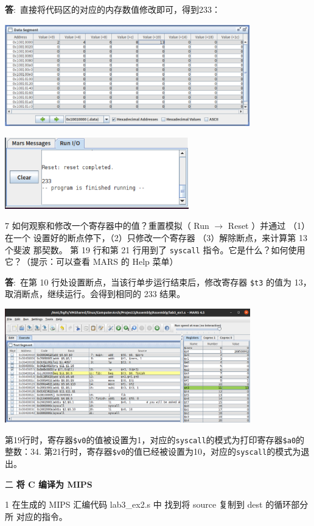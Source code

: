\documentclass[12pt,a4paper]{article}
\newenvironment{problems}{\begin{list}{}{\renewcommand{\makelabel}[1]{\textbf{##1}.\hfil}}}{\end{list}}
\newenvironment{steps}{\begin{list}{}{\renewcommand{\makelabel}[1]{(##1)\hfil}}}{\end{list}}
\providecommand{\ans}{\textbf{答}:~}
\begin{document}
\begin{problems}
\begin{steps}
        \ans 直接将代码区的对应的内存数值修改即可，得到233：

        \includegraphics[width=0.8\textwidth]{dsf.png}

        \includegraphics[width=0.6\textwidth]{run13.png}
        \item[7] 如何观察和修改一个寄存器中的值？重置模拟（ Run $\rightarrow$ Reset ）并通过 （1）在一个
        设置好的断点停下，（2）只修改一个寄存器 （3）解除断点，来计算第 13 个斐波
        那契数。
        第 19 行和第 21 行用到了 \texttt{syscall} 指令。它是什么？如何使用它？（提示：可以查看 MARS 的 Help 菜单）

        \ans 在第 10 行处设置断点，当该行单步运行结束后，修改寄存器 \verb"$t3" 的值为 13，取消断点，继续运行。会得到相同的 233 结果。

        \includegraphics[width=0.8\textwidth]{fixreg.png}

        第19行时，寄存器\verb"$v0"的值被设置为1，对应的\verb"syscall"的模式为打印寄存器\verb"$a0"的整数：34. 第21行时，寄存器\verb"$v0"的值已经被设置为10，对应的\verb"syscall"的模式为退出。
    \end{steps} 
    \item[二] \textbf{将 C 编译为 MIPS}
    \begin{steps}
        \item[1] 在生成的 MIPS 汇编代码 lab3\_ex2.s 中 找到将 source 复制到 dest 的循环部分所
        对应的指令。


\end{steps}
\end{problems}
\end{document}
